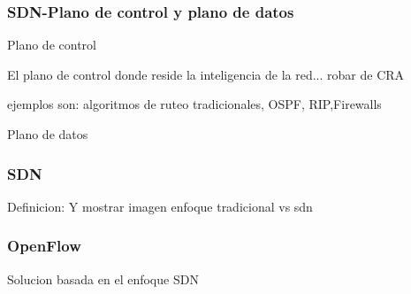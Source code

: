 \documentclass{beamer}
\begin{document}
\begin{frame}
\frametitle{SDN-Plano de control y plano de datos} 


\begin{block}{Plano de control}

El plano de control donde reside la inteligencia de la red... robar de CRA
\end{block}
ejemplos son: algoritmos de ruteo tradicionales, OSPF, RIP,Firewalls


\begin{block}{Plano de datos}
\end{block}




\end{frame}

\begin{frame}
\frametitle{SDN} 
Definicion:
Y mostrar imagen enfoque tradicional vs sdn

\end{frame}


%
%
%
%
%
%
%
%
%
%
%
%
%
%
%
%
%



\begin{frame}
\frametitle{OpenFlow} 
Solucion basada en el enfoque SDN


\end{frame}
\end{document}

